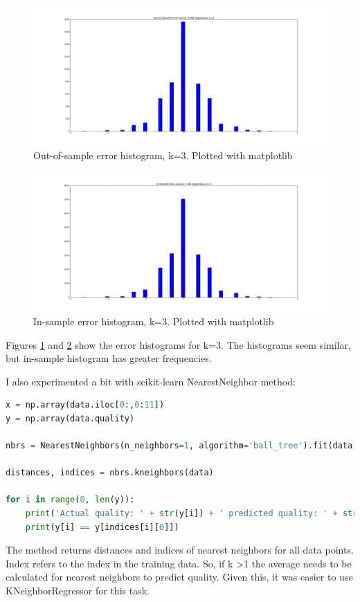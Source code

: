 \documentclass[12pt]{article}
\begin{document}
\begin{figure}[H]
    \centering
    \includegraphics[width=1\textwidth]{figures/task2/k3_oos}
    \caption{Out-of-sample error histogram, k=3. Plotted with matplotlib}
    \label{fig:k3_oos_task2}
\end{figure}

\begin{figure}[H]
    \centering
    \includegraphics[width=1\textwidth]{figures/task2/k3_is}
    \caption{In-sample error histogram, k=3. Plotted with matplotlib}
    \label{fig:k3_is_task2}
\end{figure}

Figures \ref{fig:k3_oos_task2} and \ref{fig:k3_is_task2} show the error histograms for k=3. The histograms seem similar, but in-sample histogram has greater frequencies.

\vspace{5mm} %

I also experimented a bit with scikit-learn NearestNeighbor method:

\begin{lstlisting}[language=Python]
x = np.array(data.iloc[0:,0:11])
y = np.array(data.quality)

nbrs = NearestNeighbors(n_neighbors=1, algorithm='ball_tree').fit(data)

distances, indices = nbrs.kneighbors(data)

for i in range(0, len(y)):
	print('Actual quality: ' + str(y[i]) + ' predicted quality: ' + str(y[indices[i][0]]))
	print(y[i] == y[indices[i][0]])
\end{lstlisting}

The method returns distances and indices of nearest neighbors for all data points. Index refers to the index in the training data. So, if k \textgreater 1 the average needs to be calculated for nearest neighbors to predict quality. Given this, it was easier to use KNeighborRegressor for this task.
\end{document}
